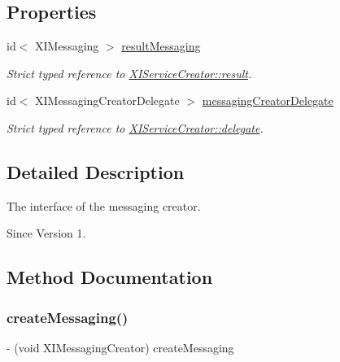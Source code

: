 \subsection*{Properties}
\begin{DoxyCompactItemize}
\item 
id$<$ X\+I\+Messaging $>$ \hyperlink{protocol_x_i_messaging_creator_01-p_a056b33d12a0b3042e89b5cd5fc83250d}{result\+Messaging}
\begin{DoxyCompactList}\small\item\em Strict typed reference to \hyperlink{}{X\+I\+Service\+Creator\+::result}. \end{DoxyCompactList}\item 
id$<$ X\+I\+Messaging\+Creator\+Delegate $>$ \hyperlink{protocol_x_i_messaging_creator_01-p_a75e60b04ff2a8900116fe2b3e60485b7}{messaging\+Creator\+Delegate}
\begin{DoxyCompactList}\small\item\em Strict typed reference to \hyperlink{}{X\+I\+Service\+Creator\+::delegate}. \end{DoxyCompactList}\end{DoxyCompactItemize}


\subsection{Detailed Description}
The interface of the messaging creator. 

\begin{DoxySince}{Since}
Version 1. 
\end{DoxySince}


\subsection{Method Documentation}
\hypertarget{protocol_x_i_messaging_creator_01-p_a9f3835053d9eda97c3ffbb03536dd794}{}\label{protocol_x_i_messaging_creator_01-p_a9f3835053d9eda97c3ffbb03536dd794} 
\subsubsection{\texorpdfstring{create\+Messaging()}{createMessaging()}}
{\footnotesize\ttfamily -\/ (void X\+I\+Messaging\+Creator) create\+Messaging \begin{DoxyParamCaption}{ }\end{DoxyParamCaption}}



